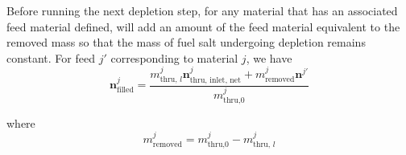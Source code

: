 Before running the next depletion step, for any material that has an associated
feed material defined, \SaltProc will add an amount of the feed material
equivalent to the removed mass so that the mass of fuel salt undergoing depletion
remains constant.
For feed $j'$ corresponding to material $j$, we have
\begin{equation}
    \mathbf{n}^{j}_\text{filled} = \frac{m^{j}_{\text{thru, }l}\mathbf{n}^{j}_{\text{thru, inlet, net}} +  m^{j}_{\text{removed}}\mathbf{n}^{j'}}{m^{j}_{\text{thru,}0}}
\end{equation}

where 
\begin{equation}
    m^{j}_{\text{removed}} = m^{j}_{\text{thru,}0} - m^{j}_{\text{thru, } l}
\end{equation}

